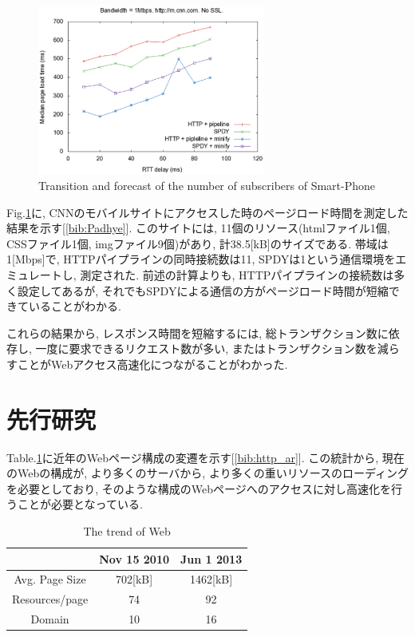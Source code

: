 \documentclass[twocolumn]{jsarticle}
\begin{document}
\begin{figure}[h]
  \centering
  \includegraphics[width=7.5cm]{eps/compare.eps}
  \caption{Transition and forecast of the number of subscribers of Smart-Phone}
  \label{fig:compare}
\end{figure}
Fig.\ref{fig:compare}に,
CNNのモバイルサイトにアクセスした時のページロード時間を測定した結果を示す[\ref{bib:Padhye}].
このサイトには, 11個のリソース(htmlファイル1個, CSSファイル1個, imgファイル9個)があり, 計38.5[kB]のサイズである.
帯域は1[Mbps]で, HTTPパイプラインの同時接続数は11, SPDYは1という通信環境をエミュレートし, 測定された.
前述の計算よりも, HTTPパイプラインの接続数は多く設定してあるが, それでもSPDYによる通信の方がページロード時間が短縮できていることがわかる.

これらの結果から, レスポンス時間を短縮するには, 総トランザクション数に依存し, 一度に要求できるリクエスト数が多い,
またはトランザクション数を減らすことがWebアクセス高速化につながることがわかった.

\section{先行研究}

Table.\ref{tbl:trend}に近年のWebページ構成の変遷を示す[\ref{bib:http_ar}].
この統計から, 現在のWebの構成が, より多くのサーバから, より多くの重いリソースのローディングを必要としており,
そのような構成のWebページへのアクセスに対し高速化を行うことが必要となっている.
\begin{table}[!h]
\caption{The trend of Web}
\begin{tabular}{|c|c|c|}
\hline
&Nov 15 2010 & Jun 1 2013 \\ \hline \hline
Avg. Page Size & 702[kB] & 1462[kB] \\ \hline
Resources/page& 74 & 92 \\ \hline
Domain& 10 & 16 \\
\hline
\end{tabular}
\label{tbl:trend}
\end{table}
\end{document}
